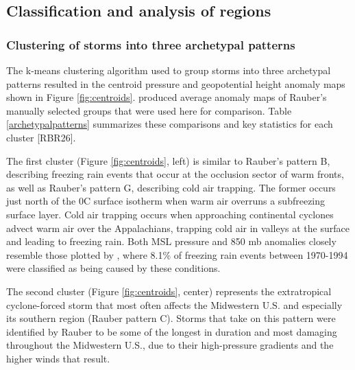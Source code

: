 \documentclass[twocol]{ametsoc}
\begin{document}



\subsection{Classification and analysis of regions}

\subsubsection{Clustering of storms into three archetypal patterns}

The k-means clustering algorithm used to group storms into three archetypal patterns resulted in the centroid pressure and geopotential height anomaly maps shown in Figure \ref{fig:centroids}. \citet{erfani2012automated} produced average anomaly maps of Rauber's manually selected groups that were used here for comparison. Table \ref{archetypalpatterns} summarizes these comparisons and key statistics for each cluster  [RBR26].



The first cluster (Figure \ref{fig:centroids}, left) is similar to Rauber's pattern B, describing freezing rain events that occur at the occlusion sector of warm fronts, as well as Rauber's pattern G, describing cold air trapping. The former occurs just north of the 0\degree C surface isotherm when warm air overruns a subfreezing surface layer. Cold air trapping occurs when approaching continental cyclones advect warm air over the Appalachians, trapping cold air in valleys at the surface and leading to freezing rain. Both MSL pressure and 850 mb anomalies closely resemble those plotted by \citet{rauber2001synoptic}, where  8.1\% of freezing rain events between 1970-1994 were classified as being caused by these conditions. 



The second cluster (Figure \ref{fig:centroids}, center) represents the extratropical cyclone-forced storm that most often affects the Midwestern U.S. and especially its southern region (Rauber pattern C). Storms that take on this pattern were identified by Rauber to be some of the longest in duration and most damaging throughout the Midwestern U.S., due to their high-pressure gradients and the higher winds that result. 
\end{document}
